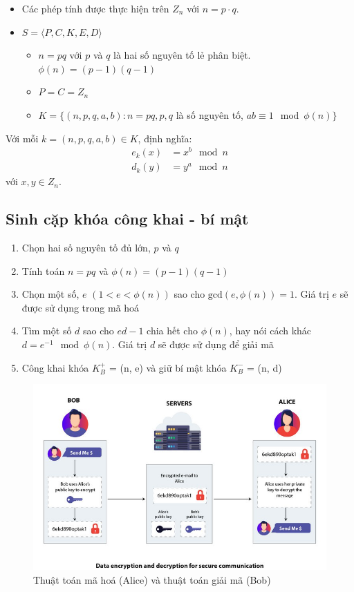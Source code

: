 \documentclass{article}
\begin{document}
\begin{itemize}
\item Các phép tính được thực hiện trên $Z_n$ với $n = p \cdot q$.
\item $S = \langle P, C, K, E, D \rangle$
\begin{itemize}
\item $n = pq$ với $p$ và $q$ là hai số nguyên tố lẻ phân biệt. $\phi(n) = (p-1)(q-1)$
\item $P = C = Z_n$
\item $K = \{(n, p, q, a, b) : n = pq, p, q$ là số nguyên tố, $ab \equiv 1 \mod \phi(n) \}$
\end{itemize}
\end{itemize}

Với mỗi $k = (n, p, q, a, b) \in K$, định nghĩa:
\begin{align*}
e_k(x) &= x^b \mod n \\
d_k(y) &= y^a \mod n
\end{align*}
với $x, y \in Z_n$.

\subsection{Sinh cặp khóa công khai - bí mật}

\begin{enumerate}
\item Chọn hai số nguyên tố đủ lớn, $p$ và $q$
\item Tính toán $n = pq$ và $\phi(n) = (p - 1)(q - 1)$
\item Chọn một số, $e$ $(1 < e < \phi(n))$ sao cho $\text{gcd}(e, \phi(n)) = 1$. Giá trị $e$ sẽ được sử dụng trong mã hoá
\item Tìm một số $d$ sao cho $ed - 1$ chia hết cho $\phi(n)$, hay nói cách khác $d = e^{-1} \mod \phi(n)$. Giá trị $d$ sẽ được sử dụng để giải mã
\item Công khai khóa $K^+_B$ = (n, e) và giữ bí mật khóa $K^-_B$ = (n, d)
\end{enumerate}

\begin{figure}[H]
\centering
\includegraphics[scale = 0.4]{pictures/Bob_Alice.jpg}
\caption{Thuật toán mã hoá (Alice) và thuật toán giải mã (Bob)}
\end{figure}
\end{document}
